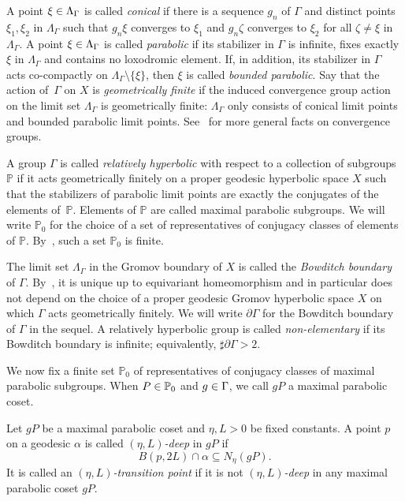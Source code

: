 \documentclass[AHL,Unicode,longabstracts]{cedram}
\newcommand{\bbP}{\mathbb{P}}
\let\oldin\in
\renewcommand{\in}{\mathchoice{\oldin}{\oldin}{\,\oldin\,}{\,\oldin\,}}
\begin{document}
A point $\xi\in \Lambda_\Gamma$ is called \emph{conical} if there is a sequence $g_{n}$ of $\Gamma$ and distinct points $\xi_1,\xi_2$ in $\Lambda_\Gamma$ such that $g_{n}\xi$ converges to $\xi_1$ and $g_{n}\zeta$ converges to $\xi_2$ for all $\zeta\neq \xi$ in~$\Lambda_\Gamma$. A point $\xi\in \Lambda_\Gamma$ is called \emph{parabolic} if its stabilizer in $\Gamma$ is infinite, fixes exactly $\xi$ in $\Lambda_\Gamma$ and contains no loxodromic element. If, in addition, its stabilizer in $\Gamma$ acts co-compactly on $\Lambda_\Gamma \setminus \{\xi\}$, then $\xi$ is called \emph{bounded parabolic}. Say that the action of~$\Gamma$ on $X$ is \emph{geometrically finite} if the induced convergence group action on the limit set $\Lambda_
\Gamma$ is geometrically finite: $\Lambda_
\Gamma$ only consists of conical limit points and bounded parabolic limit points. See~\cite{Bo99} for more general facts on convergence groups.


A group $\Gamma$ is called \emph{relatively hyperbolic} with respect to a collection of subgroups~$\bbP$ if it acts geometrically finitely on a proper geodesic hyperbolic space $X$ such that the stabilizers of parabolic limit points are exactly the conjugates of the elements of~$\bbP$. Elements of $\bbP$ are called maximal parabolic subgroups. We will write $\bbP_0$ for the choice of a set of representatives of conjugacy classes of elements of $\bbP$. By~\cite[Proposition~6.15]{Bowditch}, such a set $\bbP_0$ is finite.

The limit set $\Lambda_\Gamma$ in the Gromov boundary of $X$ is called the \emph{Bowditch boundary} of $\Gamma$. By~\cite[Theorem~9.4]{Bowditch}, it is unique up to equivariant homeomorphism and in particular does not depend on the choice of a proper geodesic Gromov hyperbolic space $X$ on which $\Gamma$ acts geometrically finitely. We will write $\partial\Gamma$ for the Bowditch boundary of $\Gamma$ in the sequel. A relatively hyperbolic group is called \emph{non-elementary} if its Bowditch boundary is infinite; equivalently, $\sharp \partial\Gamma>2$.


We now fix a finite set $\bbP_0$ of representatives of conjugacy classes of maximal parabolic subgroups. When $P\in \bbP_0$ and $g\in \Gamma$, we call $gP$ a maximal parabolic coset.
\begin{defi}
Let $gP$ be a maximal parabolic coset and $\eta, L>0$ be fixed constants. A point $p$ on a geodesic $\alpha$ is called \emph{$(\eta, L)$-deep} in $gP$ if
\[
B(p, 2L)\cap \alpha\subseteq N_\eta(gP).
\]
It is called an \emph{$(\eta, L)$-transition point} if it is not \emph{$(\eta, L)$-deep} in any maximal parabolic coset $gP$.
\end{defi}
\end{document}
